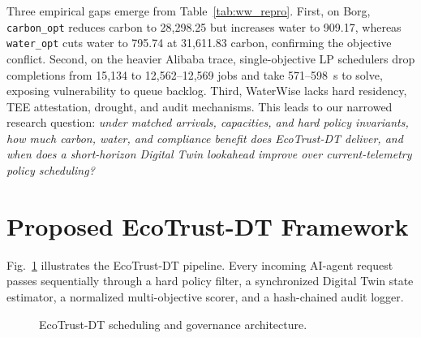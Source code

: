 \documentclass[conference]{IEEEtran}
\begin{document}
Three empirical gaps emerge from Table~\ref{tab:ww_repro}. First, on Borg, \texttt{carbon\_opt} reduces carbon to 28,298.25 but increases water to 909.17, whereas \texttt{water\_opt} cuts water to 795.74 at 31,611.83 carbon, confirming the objective conflict. Second, on the heavier Alibaba trace, single-objective LP schedulers drop completions from 15,134 to 12,562--12,569 jobs and take 571--598~s to solve, exposing vulnerability to queue backlog. Third, WaterWise lacks hard residency, TEE attestation, drought, and audit mechanisms. This leads to our narrowed research question: \textit{under matched arrivals, capacities, and hard policy invariants, how much carbon, water, and compliance benefit does EcoTrust-DT deliver, and when does a short-horizon Digital Twin lookahead improve over current-telemetry policy scheduling?}

\section{Proposed EcoTrust-DT Framework}
\label{sec:methodology}

Fig.~\ref{fig:arch} illustrates the EcoTrust-DT pipeline. Every incoming AI-agent request passes sequentially through a hard policy filter, a synchronized Digital Twin state estimator, a normalized multi-objective scorer, and a hash-chained audit logger.

\begin{figure}[!t]
\centering
{}
\caption{EcoTrust-DT scheduling and governance architecture.}
\label{fig:arch}
\end{figure}
\end{document}
